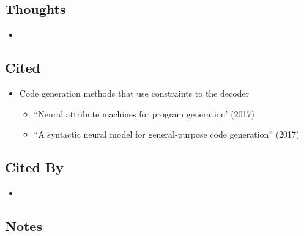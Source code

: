 \documentclass{article}
\begin{document}
\subsection*{Thoughts}
\begin{itemize}
	\item
\end{itemize}

\subsection*{Cited}
\begin{itemize}
	\item Code generation methods that use constraints to the decoder
	\begin{itemize}
		\item ``Neural attribute machines for program generation' (2017)
		\item ``A syntactic neural model for general-purpose code generation'' (2017)
	\end{itemize}
\end{itemize}

\subsection*{Cited By}
\begin{itemize}
	\item
\end{itemize}

\subsection*{Notes}
\end{document}
